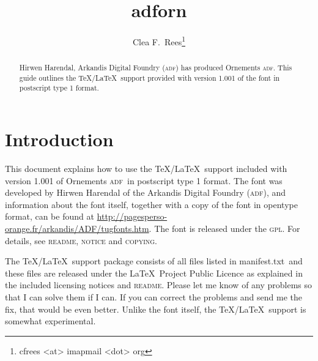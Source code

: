 \documentclass[10pt,british]{article}
\title{adforn}
\author{Clea F.\ Rees\footnote{cfrees <at> imapmail <dot> org}}
\date{\dyddiad}
\begin{document}
\maketitle\thispagestyle{empty}
\setlength{\parindent}{0pt}
\setlength{\parskip}{0.5em}
	
	
\newcommand*{\adf}{\textsc{adf}}
\newcommand*{\lpack}[1]{\textsf{#1}}
\newcommand*{\fgroup}[1]{\textsf{#1}}
\newcommand*{\fname}[1]{\textsf{#1}}

\begin{abstract}
	\hspace*{-\parindent}Hirwen Harendal, Arkandis Digital Foundry (\adf) has produced Ornements \adf. This guide outlines the \TeX/\LaTeX\ support provided with version 1.001 of the font in postscript type 1 format.
\end{abstract}

\section{Introduction}

This document explains how to use the \TeX/\LaTeX\ support included with version 1.001 of Ornements \adf\ in postscript type 1 format. The font was developed by Hirwen Harendal of the Arkandis Digital Foundry (\adf), and information about the font itself, together with a copy of the font in opentype format, can be found at \url{http://pagesperso-orange.fr/arkandis/ADF/tugfonts.htm}. The font is released under the \textsc{gpl}. For details, see \textsc{readme}, \textsc{notice} and \textsc{copying}.

The \TeX/\LaTeX\ support package consists of all files listed in \lpack{manifest.txt}\ and these files are released under the \LaTeX\ Project Public Licence as explained in the included licensing notices and \textsc{readme}. Please let me know of any problems so that I can solve them if I can. If you can correct the problems and send me the fix, that would be even better. Unlike the font itself, the \TeX/\LaTeX\ support is somewhat experimental. 
\end{document}
